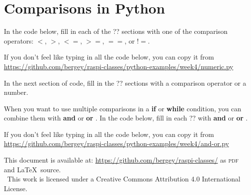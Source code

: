 \documentclass{article}
\newcommand\And{\textbf{and} }
\newcommand\Or{\textbf{or} }
\begin{document}
\section{Comparisons in Python}

In the code below, fill in each of the ?? sections with one of the comparison operators:   $<$, $>$, $<=$, $>=$, $==$, or $!=$.

If you don't feel like typing in all the code below, you can copy it from \url{https://github.com/bergey/raspi-classes/python-examples/week4/numeric.py}



In the next section of code, fill in the ?? sections with a comparison operator or a number.



When you want to use multiple comparisons in a \textbf{if} or \textbf{while} condition, you can combine them with \And or \Or.  In the code below, fill in each ?? with \And or \Or.

If you don't feel like typing in all the code below, you can copy it from \url{https://github.com/bergey/raspi-classes/python-examples/week4/and-or.py}



This document is available at: \url{https://github.com/bergey/raspi-classes/} as \textsc{pdf} and \LaTeX\ source.\\
\ccby \ This work is licensed under a Creative Commons Attribution 4.0 International License.
\end{document}
